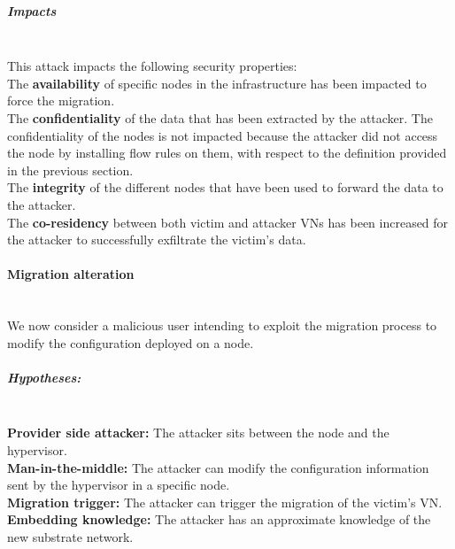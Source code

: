 \subparagraph{Impacts}\textbf{\\}
This attack impacts the following security properties:\\
The \textbf{availability} of specific nodes in the infrastructure has been impacted to force the migration.\\
The \textbf{confidentiality} of the data that has been extracted by the attacker.
The confidentiality of the nodes is not impacted because the attacker did not access the node by installing flow rules on them, with respect to the definition provided in the previous section.\\
The \textbf{integrity} of the different nodes that have been used to forward the data to the attacker.\\
The \textbf{co-residency} between both victim and attacker VNs has been increased for the attacker to successfully exfiltrate the victim's data.


\paragraph{Migration alteration}\textbf{\\}
We now consider a malicious user intending to exploit the migration process to modify the configuration deployed on a node.

\subparagraph{Hypotheses:}\textbf{\\}
\textbf{Provider side attacker:} The attacker sits between the node and the hypervisor.\\
\textbf{Man-in-the-middle:} The attacker can modify the configuration information sent by the hypervisor in a specific node.\\
\textbf{Migration trigger:} The attacker can trigger the migration of the victim's VN.\\
\textbf{Embedding knowledge:} The attacker has an approximate knowledge of the new substrate network.


